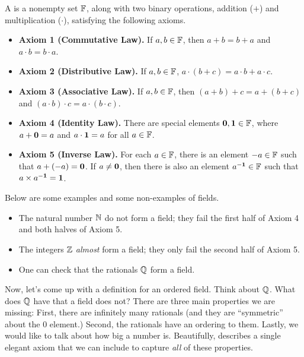 \documentclass[11pt,twoside=off,numbers=noenddot]{scrbook}
\begin{document}
\begin{definition}[Fields]
    A  is a nonempty set $\mathbb F$, along with two binary operations, addition ($+$) and multiplication ($\cdot$), satisfying the following axioms.
    \begin{itemize}
        \item \textbf{Axiom 1 (Commutative Law).} If $a, b \in \mathbb F$, then $a + b = b + a$ and $a \cdot b = b \cdot a$.
        \item \textbf{Axiom 2 (Distributive Law).} If $a, b \in \mathbb F$, $a \cdot (b + c) = a \cdot b + a \cdot c$.
        \item \textbf{Axiom 3 (Associative Law).} If $a, b \in \mathbb F$, then $(a + b) + c = a + (b + c)$ and $(a \cdot b) \cdot c = a \cdot (b \cdot c)$.
        \item \textbf{Axiom 4 (Identity Law).} There are special elements $\textbf{0}, \textbf{1} \in \mathbb F$, where $a + \textbf{0} = a$ and $a \cdot \textbf{1} = a$ for all $a \in \mathbb F$.
        \item \textbf{Axiom 5 (Inverse Law).} For each $a \in \mathbb F$, there is an element $-a \in \mathbb F$ such that $a + (-a) = \textbf{0}$. If $a \neq \textbf{0}$, then there is also an element $a^{-\textbf{1}} \in \mathbb F$ such that $a \times a^{-\textbf{1}} = \textbf{1}$.
    \end{itemize}
\end{definition}

\begin{example}
    Below are some examples and some non-examples of fields.
    \begin{itemize}
        \item The natural number $\mathbb N$ do not form a field; they fail the first half of Axiom 4 and both halves of Axiom 5.
        \item The integers $\mathbb Z$ \textit{almost} form a field; they only fail the second half of Axiom 5.
        \item One can check that the rationals $\mathbb Q$ form a field.
    \end{itemize}
\end{example}

\begin{remark}
    Now, let's come up with a definition for an ordered field. Think about $\mathbb Q$. What does $\mathbb Q$ have that a field does not? There are three main properties we are missing: First, there are infinitely many rationals (and they are ``symmetric'' about the 0 element.) Second, the rationals have an ordering to them. Lastly, we would like to talk about how big a number is. Beautifully,  describes a single elegant axiom that we can include to capture \textit{all} of these properties.
\end{remark}
\end{document}

